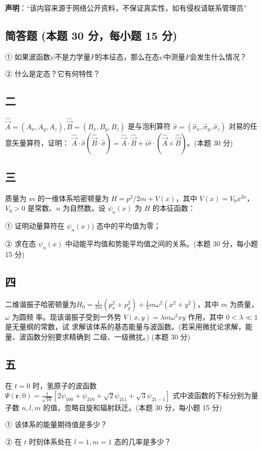 
\textbf{声明}：“该内容来源于网络公开资料，不保证真实性，如有侵权请联系管理员”

\subsection{简答题 (本题 30 分，每小题 15 分)}

① 如果波函数$\psi$不是力学量$F$的本征态，那么在态$\psi$中测量$F$会发生什么情况？

② 什么是定态？它有何特性？

\subsection{二}
$\hat{\vec A} = (A_x, A_y, A_z), \hat{\vec B} = (B_x, B_y, B_z)$ 是与泡利算符 $\hat{\sigma} = (\hat{\sigma}_x, \hat{\sigma}_y, \hat{\sigma}_z)$ 对易的任意矢量算符，证明：
$\hat{\vec A} \cdot \hat{\sigma}(\hat{\vec B} \cdot \hat{\sigma}) = \hat{\vec A} \cdot \hat{\vec B} + i \hat{\sigma} \cdot (\hat{\vec A} \times \hat{\vec B})$。(本题 30 分)

\subsection{三}
质量为 $m$ 的一维体系哈密顿量为 $H = p^2 /2m+V(x)$，其中 $V(x)= V_0 x^{2n}$，$V_0 > 0$ 是常数、$n$ 为自然数。设 $\psi_n(x)$ 为 $H$ 的本征函数：

① 证明动量算符在 $\psi_n(x)$) 态中的平均值为零；

② 求在态 $\psi_n(x)$ 中动能平均值和势能平均值之间的关系。(本题 30 分，每小题 15 分)

\subsection{四}
二维谐振子哈密顿量为$H_0 = \frac{1}{2m} \left( p_x^2 + p_y^2 \right) + \frac{1}{2} m \omega^2 \left( x^2 + y^2 \right)$，其中 $m$ 为质量，$\omega$ 为圆频
率。现该谐振子受到一外势 $V(x,y)=\lambda m\omega^2xy$ 作用，其中 $0<\lambda \ll 1$ 是无量纲的常数，试
求解该体系的基态能量与波函数。(若采用微扰论求解，能量、波函数分别要求精确到
二级、一级微扰。) (本题 30 分)

\subsection{五}
在 $t=0$ 时，氢原子的波函数$\Psi(\mathbf{r}, 0) = \frac{1}{\sqrt{10}} \left[ 2\psi_{100} + \psi_{210} + \sqrt{2}\psi_{211} + \sqrt{3}\psi_{21-1} \right]$
式中波函数的下标分别为量子数 $n,l,m$ 的值，忽略自旋和辐射跃迁。(本题 30 分，每小题 15 分)

① 该体系的能量期待值是多少？

② 在 $t$ 时刻体系处在 $l=1,m = 1$ 态的几率是多少？